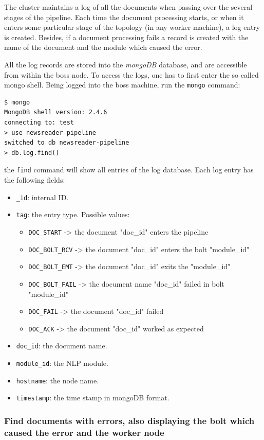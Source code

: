 \documentclass[a4]{article}
\begin{document}
The cluster maintains a log of all the documents when passing over the
several stages of the pipeline. Each time the document processing starts, or
when it enters some particular stage of the topology (in any worker
machine), a log entry is created. Besides, if a document processing fails a
record is created with the name of the document and the module which caused
the error.

All the log records are stored into the \emph{mongoDB} database, and are
accessible from within the boss node. To access the logs, one has to first
enter the so called mongo shell. Being logged into the boss machine, run the
\texttt{mongo} command:

\begin{verbatim}
$ mongo
MongoDB shell version: 2.4.6
connecting to: test
> use newsreader-pipeline
switched to db newsreader-pipeline
> db.log.find()
\end{verbatim}

the \texttt{find} command will show all entries of the log database. Each
log entry has the following fields:
\begin{itemize}
\item \texttt{\_id}: internal ID.
\item \texttt{tag}: the entry type. Possible values:
  \begin{itemize}
  \item \texttt{DOC\_START}    -> the document "doc\_id" enters the pipeline
  \item \texttt{DOC\_BOLT\_RCV} -> the document "doc\_id" enters the bolt  "module\_id"
  \item \texttt{DOC\_BOLT\_EMT} -> the document "doc\_id" exits the "module\_id"
  \item \texttt{DOC\_BOLT\_FAIL} -> the document name "doc\_id" failed in bolt "module\_id"
  \item \texttt{DOC\_FAIL} -> the document "doc\_id" failed
  \item \texttt{DOC\_ACK} -> the document "doc\_id" worked as expected
  \end{itemize}
\item \texttt{doc\_id}: the document name.
\item \texttt{module\_id}: the NLP module.
\item \texttt{hostname}: the node name.
\item \texttt{timestamp}: the time stamp in mongoDB format.
\end{itemize}

\subsubsection*{Find documents with errors, also displaying the bolt which caused the error and the worker node}
\end{document}
